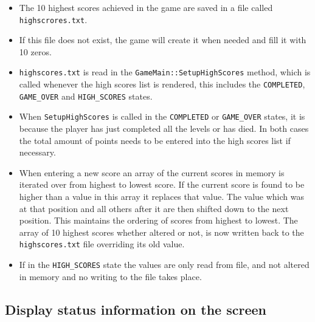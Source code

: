 \begin{itemize}
	\item The 10 highest scores achieved in the game are saved in a file called \verb!highscrores.txt!.
	\item If this file does not exist, the game will create it when needed and fill it with 10 zeros.
	\item \verb!highscores.txt! is read in the \verb!GameMain::SetupHighScores! method, which is called whenever the high scores list is rendered, this includes the \verb!COMPLETED!, \verb!GAME_OVER! and \verb!HIGH_SCORES! states.
	\item When \verb!SetupHighScores! is called in the \verb!COMPLETED! or \verb!GAME_OVER! states, it is because the player has just completed all the levels or has died. In both cases the total amount of points needs to be entered into the high scores list if necessary.
	\item When entering a new score an array of the current scores in memory is iterated over from highest to lowest score. If the current score is found to be higher than a value in this array it replaces that value. The value which was at that position and all others after it are then shifted down to the next position. This maintains the ordering of scores from highest to lowest. The array of 10 highest scores whether altered or not, is now written back to the \verb!highscores.txt! file overriding its old value.
	\item If in the \verb!HIGH_SCORES! state the values are only read from file, and not altered in memory and no writing to the file takes place.
\end{itemize}

\subsection{Display status information on the screen}
\label{sec:status-info}

